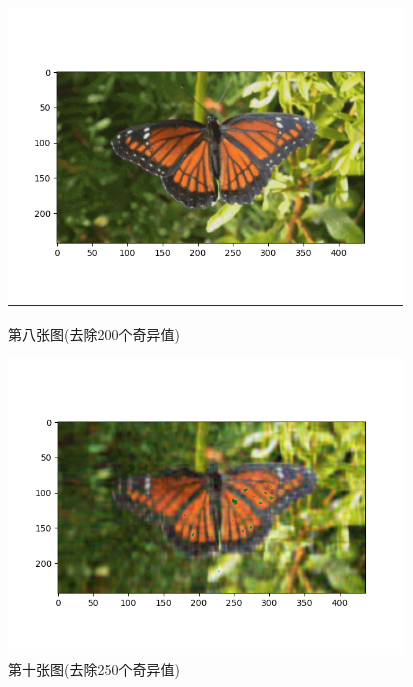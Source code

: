 \documentclass[UTF8]{ctexart}
\begin{document}
\begin{figure}[htbp]
  \centering
  \begin{minipage}{0.4\textwidth}
    \centering
    \includegraphics[width=\textwidth]{4.png}
    \caption{第八张图(去除200个奇异值)}
    \label{fig:subfig1}
  \end{minipage}
  \hspace{1cm} %
  \begin{minipage}{0.4\textwidth}
    \centering
    \includegraphics[width=\textwidth]{10.png}
    \caption{第十张图(去除250个奇异值)}
    \label{fig:subfig2}
  \end{minipage}

  \label{fig:combined}
  \end{figure}
\end{document}

